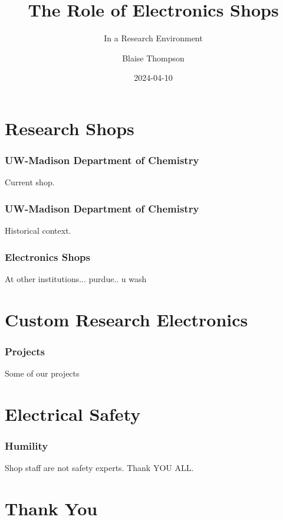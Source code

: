 \documentclass{presentation}
\title{The Role of Electronics Shops}
\subtitle{In a Research Environment}
\author{Blaise Thompson}
\institute{University of Wisconsin--Madison}
\date{2024-04-10}
\begin{document}
\maketitle

\section{Research Shops}

\begin{frame}\frametitle{UW-Madison Department of Chemistry}
  Current shop.
\end{frame}

\begin{frame}\frametitle{UW-Madison Department of Chemistry}
  Historical context.
\end{frame}

\begin{frame}\frametitle{Electronics Shops}
  At other institutions... purdue.. u wash
\end{frame}

\section{Custom Research Electronics}

\begin{frame}\frametitle{Projects}
  Some of our projects
\end{frame}

\section{Electrical Safety}

\begin{frame}\frametitle{Humility}
  Shop staff are not safety experts.
  \vfill
  Thank YOU ALL.
\end{frame}

\section{Thank You}
\end{document}
